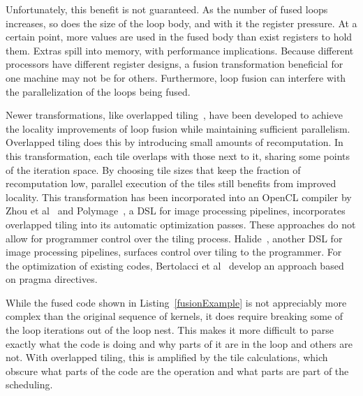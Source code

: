 Unfortunately, this benefit is not guaranteed.
As the number of fused loops increases, so does the size of the loop body, and with it the register pressure. 
At a certain point, more values are used in the fused body than exist registers to hold them.
Extras spill into memory, with performance implications.
Because different processors have different register designs, a fusion transformation beneficial for one machine may not be for others.
Furthermore, loop fusion can interfere with the parallelization of the loops being fused.

Newer transformations, like overlapped tiling~\cite{holewinski2012high,krishnamoorthy2007effective}, have been developed to achieve the locality improvements of loop fusion while maintaining sufficient parallelism.
Overlapped tiling does this by introducing small amounts of recomputation.
In this transformation, each tile overlaps with those next to it, sharing some points of the iteration space.
By choosing tile sizes that keep the fraction of recomputation low, parallel execution of the tiles still benefits from improved locality.
This transformation has been incorporated into an OpenCL compiler by Zhou et al~\cite{zhou2012hierarchical} and Polymage~\cite{mullapudi2015polymage}, a DSL for image processing pipelines, incorporates overlapped tiling into its automatic optimization passes.
These approaches do not allow for programmer control over the tiling process.
Halide~\cite{ragan-kelley2013halide}, another DSL for image processing pipelines, surfaces control over tiling to the programmer.
For the optimization of existing codes, Bertolacci et al~\cite{bertolacci2019using} develop an approach based on pragma directives.

While the fused code shown in Listing~\ref{fusionExample} is not appreciably more complex than the original sequence of kernels, it does require breaking some of the loop iterations out of the loop nest.
This makes it more difficult to parse exactly what the code is doing and why parts of it are in the loop and others are not.
With overlapped tiling, this is amplified by the tile calculations, which obscure what parts of the code are the operation and what parts are part of the scheduling. 

